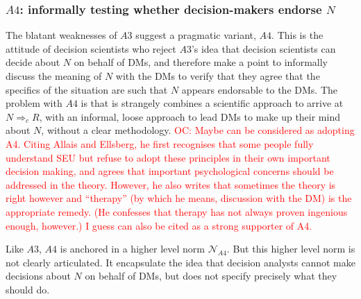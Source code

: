 \documentclass[preprint, french, english, 11pt, authoryear]{elsarticle}%
\newcommand{\protectforpdf}[1]{\texorpdfstring{\ensuremath{#1}}{#1}}
\newcommand{\commentOC}[1]{\textcolor{red}{OC: #1}}
\begin{document}
\subsubsection{\protectforpdf{A4}: informally testing whether decision-makers endorse \protectforpdf{N}}
The blatant weaknesses of $A3$ suggest a pragmatic variant, $A4$. This is the attitude of decision scientists who reject $A3$'s idea that decision scientists can decide about $N$ on behalf of \acp{DM}, and therefore make a point to informally discuss the meaning of $N$ with the \acp{DM} to verify that they agree that the specifics of the situation are such that $N$ appears endorsable to the \acp{DM}. The problem with $A4$ is that is strangely combines a scientific approach to arrive at $N ⇒_c R$, with an informal, loose approach to lead \acp{DM} to make up their mind about $N$, without a clear methodology. \commentOC{Maybe \citet{raiffa_back_1985} can be considered as adopting A4. Citing Allais and Ellsberg, he first recognises that some people fully understand SEU but refuse to adopt these principles in their own important decision making, and agrees that important psychological concerns should be addressed in the theory. However, he also writes that sometimes the theory is right however and “therapy” (by which he means, discussion with the DM) is the appropriate remedy. (He confesses that therapy has not always proven ingenious enough, however.) I guess \citet{roy_multicriteria_1996} can also be cited as a strong supporter of A4.}

Like $A3$, $A4$ is anchored in a higher level norm $\mathscr{N}_{A4}$. But this higher level norm is not clearly articulated. It encapsulate the idea that decision analysts cannot make decisions about $N$ on behalf of \acp{DM}, but does not specify precisely what they should do.
\end{document}
